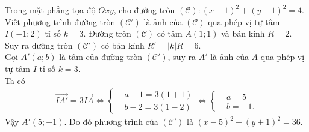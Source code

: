 \begin{bt}%
 Trong mặt phẳng tọa độ $Oxy$, cho đường tròn $(\mathscr{C})\colon (x-1)^2+(y-1)^2=4$. Viết phương trình đường tròn $(\mathscr{C}')$ là ảnh của $(\mathscr{C})$ qua phép vị tự tâm $I(-1;2)$ tỉ số $k=3$.
 \loigiai
  {
  Đường tròn $(\mathscr{C})$ có tâm $A(1;1)$ và bán kính $R=2$.\\
  Suy ra đường tròn $(\mathscr{C}')$ có bán kính $R'=|k|R=6$.\\
  Gọi $A'(a;b)$ là tâm của đường tròn $(\mathscr{C}')$, suy ra $A'$ là ảnh của $A$ qua phép vị tự tâm $I$ tỉ số $k=3$.\\
  Ta có
  \begin{eqnarray*}
   \overrightarrow{IA'}=3\overrightarrow{IA} \Leftrightarrow \left\{\begin{aligned}&a+1=3(1+1) \\&b-2=3(1-2)\end{aligned}\right. \Leftrightarrow \left\{\begin{aligned}&a=5 \\&b=-1.\end{aligned}\right.
  \end{eqnarray*}
  Vậy $A'(5;-1)$. Do đó phương trình của $(\mathscr{C}')$ là $(x-5)^2+(y+1)^2=36$.
  }
\end{bt}

